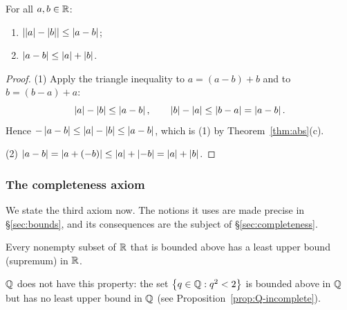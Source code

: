 \begin{corollary}\label{cor:triangle}
    For all $a,b\in\mathbb{R}$:
    \begin{enumerate}[label=(\arabic*)]
        \item $\left|\left|a\right| - \left|b\right|\right| \leq \left|a - b\right|$;
        \item $\left|a - b\right| \leq \left|a\right| + \left|b\right|$.
    \end{enumerate}
\end{corollary}

\begin{proof}
    (1) Apply the triangle inequality to $a=(a-b)+b$ and to $b=(b-a)+a$:
    \begin{equation*}
        \left|a\right|-\left|b\right|\leq\left|a-b\right|,
        \qquad
        \left|b\right|-\left|a\right|\leq\left|b-a\right|=\left|a-b\right|.
    \end{equation*}
    Hence $-\left|a-b\right|\leq\left|a\right|-\left|b\right|\leq\left|a-b\right|$, which is (1) by
    Theorem~\ref{thm:abs}(c).

    (2) $\left|a - b\right| = \left|a + (-b)\right| \leq \left|a\right| + \left|-b\right|
    = \left|a\right| + \left|b\right|$.
\end{proof}

\subsubsection{The completeness axiom}
We state the third axiom now. The notions it uses are made precise in \S\ref{sec:bounds}, and its consequences are the
subject of \S\ref{sec:completeness}.

\begin{axiom}[Completeness]
    Every nonempty subset of $\mathbb{R}$ that is bounded above has a least upper
    bound (supremum) in $\mathbb{R}$.
\end{axiom}

$\mathbb{Q}$ does not have this property: the set $\left\{q\in\mathbb{Q} : q^2<2\right\}$ is bounded
above in $\mathbb{Q}$ but has no least upper bound in $\mathbb{Q}$ (see
Proposition~\ref{prop:Q-incomplete}).
